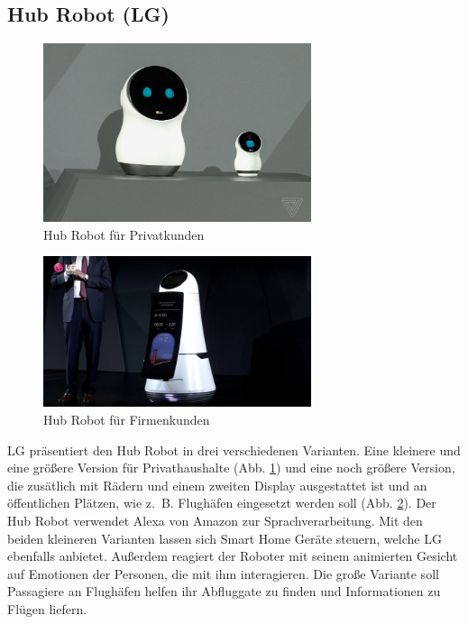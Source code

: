 \subsection{Hub Robot (LG)}
\begin{figure}
  \centering
     \includegraphics[width=0.7\textwidth]{hub_bot_privat}
  \caption{Hub Robot für Privatkunden \cite{AbbildungHubBotPrivat}}
  \label{fig:hub-bot-privat}
\end{figure}
\begin{figure} 
  \centering
     \includegraphics[width=0.7\textwidth]{hub_bot_firmen}
  \caption{Hub Robot für Firmenkunden \cite{AbbildungHubBotFirmen}}
  \label{fig:hub-bot-firma}
\end{figure}
LG präsentiert den Hub Robot in drei verschiedenen Varianten. Eine kleinere und
eine größere Version für Privathaushalte (Abb. \ref{fig:hub-bot-privat})
und eine noch größere Version, die zusätlich mit Rädern und einem zweiten
Display ausgestattet ist und an öffentlichen Plätzen, wie z.~B. Flughäfen
eingesetzt werden soll (Abb. \ref{fig:hub-bot-firma}). Der Hub Robot verwendet
Alexa von Amazon zur Sprachverarbeitung. Mit den beiden kleineren Varianten
lassen sich Smart Home Geräte steuern, welche LG ebenfalls anbietet. Außerdem
reagiert der Roboter mit seinem animierten Gesicht auf Emotionen der Personen,
die mit ihm interagieren. Die große Variante soll Passagiere an Flughäfen helfen
ihr Abfluggate zu finden und Informationen zu Flügen liefern. \cite{Patzschke2018}

